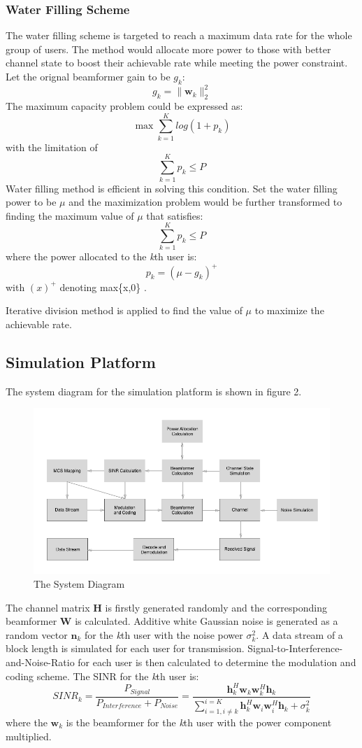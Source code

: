 \documentclass{article}
\begin{document}
\subsubsection{Water Filling Scheme}
The water filling scheme is targeted to reach a maximum data rate for the whole group of users.
The method would allocate more power to those with better channel state to boost their achievable rate while meeting the power constraint.
Let the orignal beamformer gain to be $g_k$:
\[g_k = \lVert \textbf{w}_k \rVert_{2}^2\]
The maximum capacity problem could be expressed as:
\[
\max \sum_{k=1}^{K} log(1+p_k)
\]
with the limitation of
\[\sum_{k=1}^{K} p_k \leq P\]
Water filling method is efficient in solving this condition.
Set the water filling power to be $\mu$ and the maximization problem would be further transformed
to finding the maximum value of $\mu$ that satisfies:
\[\sum_{k=1}^{K}p_k \leq P\]
where the power allocated to the \textit{k}th user is:
\[p_k = (\mu-g_k)^+\]
 with $(x)^+$ denoting max\{x,0\} \cite{TY1}.

Iterative division method is applied to find the value of $\mu$ to maximize the achievable rate.

\subsection{Simulation Platform}
The system diagram for the simulation platform is shown in figure 2.
\begin{figure}[ht]
\centering
\includegraphics[scale=0.5]{SystemDia.png}
\caption{The System Diagram}
\label{fig:SystemDia}
\end{figure}

\noindent
The channel matrix \textbf{H} is firstly generated randomly and the corresponding beamformer \textbf{W} is calculated.
Additive white Gaussian noise is generated as a random vector $\textbf{n}_k$ for the \textit{k}th user with the noise power $\sigma^2_k$.
A data stream of a block length is simulated for each user for transmission.
Signal-to-Interference-and-Noise-Ratio for each user is then calculated to determine the modulation and coding scheme.
The SINR for the \textit{k}th user is:
\[
SINR_k = \frac{P_{Signal}}{P_{Interference}+P_{Noise}} = \frac{\textbf{h}_k^H\textbf{w}_k\textbf{w}_k^H\textbf{h}_k}{\sum_{i = 1,i\neq k}^{i = K}\textbf{h}_k^H\textbf{w}_i\textbf{w}_i^H\textbf{h}_k+\sigma_k^2}
\]
where the $\textbf{w}_k$ is the beamformer for the \textit{k}th user with the power component multiplied.
\end{document}
